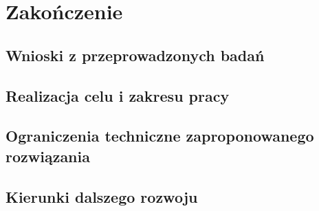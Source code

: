 \chapter{Zakończenie}
\label{ch:zakonczenie}

\section{Wnioski z przeprowadzonych badań}
\label{sec:wnioski}


\section{Realizacja celu i zakresu pracy}
\label{sec:realizacja-celu}


\section{Ograniczenia techniczne zaproponowanego rozwiązania}
\label{sec:ograniczenia-techniczne}


\section{Kierunki dalszego rozwoju}
\label{sec:kierunki-rozwoju}

